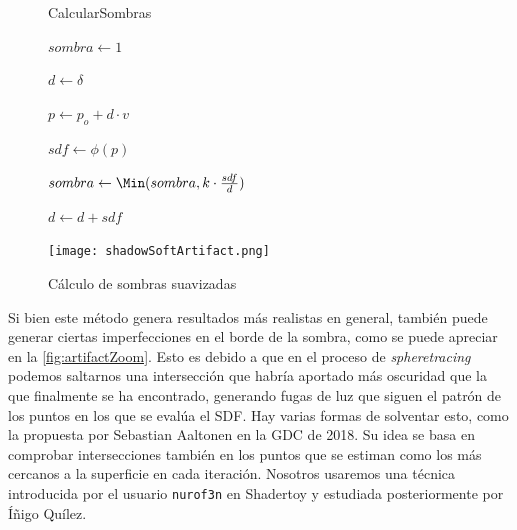 \begin{figure}[ht!]
    \centering
    \begin{minipage}{0.50\textwidth}
       \begin{algorithm}[H]
            \caption{CalcularSombras}
                $sombra \gets 1$
                
                $d \gets \delta$ 
                
                 {
                    $p \gets p_o + d \cdot v$
                    
                    $sdf \gets \phi(p)$
                    
                    $sombra \gets \Min(sombra, k\cdot \frac{sdf}{d})$
                    
                    $d \gets d + sdf$

                }

        \end{algorithm}
    \end{minipage}%
    \hfill
    \begin{minipage}{0.48\textwidth}
        \texttt{[image: shadowSoftArtifact.png]}
    \end{minipage}
    \caption{Cálculo de sombras suavizadas}
    \label{fig:sombras2}
\end{figure}

Si bien este método genera resultados más realistas en general, también puede generar ciertas imperfecciones en el borde de la sombra, como se puede apreciar en la \autoref{fig:artifactZoom}. Esto es debido a que en el proceso de \textit{spheretracing} podemos saltarnos una intersección que habría aportado más oscuridad que la que finalmente se ha encontrado, generando fugas de luz que siguen el patrón de los puntos en los que se evalúa el SDF. Hay varias formas de solventar esto, como la propuesta por Sebastian Aaltonen \cite{gdc} en la GDC de 2018. Su idea se basa en comprobar intersecciones también en los puntos que se estiman como los más cercanos a la superficie en cada iteración. Nosotros usaremos una técnica introducida por el usuario \texttt{nurof3n} \cite{shadertoy-sombras} en Shadertoy y estudiada posteriormente por Íñigo Quílez.\newline

